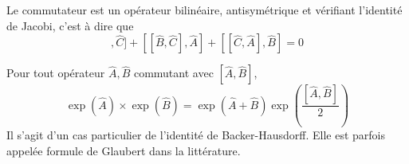 \documentclass[../Notesdecours.tex]{subfiles}
\begin{document}
\begin{Property}
	Le commutateur est un opérateur bilinéaire, antisymétrique et vérifiant l'identité de Jacobi, c'est à dire que
	\begin{equation}
		[[\hat{A},\hat{B}],\hat{C}] + [[\hat{B},\hat{C}],\hat{A}] + [[\hat{C},\hat{A}],\hat{B}] = 0
	\end{equation}
\end{Property}

\begin{theorem}
	Pour tout opérateur $\hat{A},\hat{B}$ commutant avec $[\hat{A},\hat{B}]$, 
	\begin{equation}
		\exp\left(\hat{A}\right)\times\exp\left(\hat{B}\right) = \exp\left(\hat{A}+\hat{B}\right)\exp\left(\frac{[\hat{A},\hat{B}]}{2}\right)
	\end{equation}
	Il s'agit d'un cas particulier de l'identité de Backer-Hausdorff. Elle est parfois appelée formule de Glaubert dans la littérature.
\end{theorem}
\end{document}

